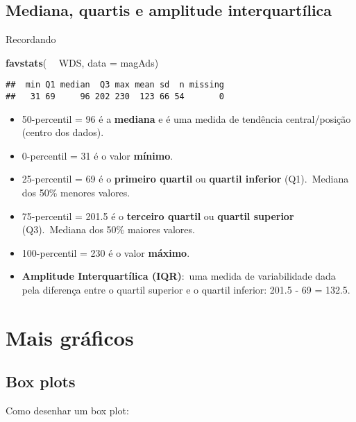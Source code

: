 \documentclass[]{article}
\newenvironment{Shaded}{\begin{snugshade}}{\end{snugshade}}
\newcommand{\KeywordTok}[1]{\textcolor[rgb]{0.13,0.29,0.53}{\textbf{#1}}}
\newcommand{\DataTypeTok}[1]{\textcolor[rgb]{0.13,0.29,0.53}{#1}}
\newcommand{\StringTok}[1]{\textcolor[rgb]{0.31,0.60,0.02}{#1}}
\newcommand{\OperatorTok}[1]{\textcolor[rgb]{0.81,0.36,0.00}{\textbf{#1}}}
\newcommand{\NormalTok}[1]{#1}
\providecommand{\tightlist}{%
  \setlength{\itemsep}{0pt}\setlength{\parskip}{0pt}}
\begin{document}
\subsection{Mediana, quartis e amplitude
interquartílica}\label{mediana-quartis-e-amplitude-interquartilica}

Recordando

\begin{Shaded}
\begin{Highlighting}[]
\KeywordTok{favstats}\NormalTok{( }\OperatorTok{~}\StringTok{ }\NormalTok{WDS, }\DataTypeTok{data =}\NormalTok{ magAds)}
\end{Highlighting}
\end{Shaded}

\begin{verbatim}
##  min Q1 median  Q3 max mean sd  n missing
##   31 69     96 202 230  123 66 54       0
\end{verbatim}

\begin{itemize}
\tightlist
\item
  50-percentil = 96 é a \textbf{mediana} e é uma medida de tendência
  central/posição (centro dos dados).
\item
  0-percentil = 31 é o valor \textbf{mínimo}.
\item
  25-percentil = 69 é o \textbf{primeiro quartil} ou \textbf{quartil
  inferior} (Q1).~Mediana dos 50\% menores valores.
\item
  75-percentil = 201.5 é o \textbf{terceiro quartil} ou \textbf{quartil
  superior} (Q3).~Mediana dos 50\% maiores valores.
\item
  100-percentil = 230 é o valor \textbf{máximo}.
\item
  \textbf{Amplitude Interquartílica (IQR)}:~uma medida de variabilidade
  dada pela diferença entre o quartil superior e o quartil inferior:
  201.5 - 69 = 132.5.
\end{itemize}

\section{Mais gráficos}\label{mais-graficos}

\subsection{Box plots}\label{box-plots}

Como desenhar um box plot:
\end{document}

